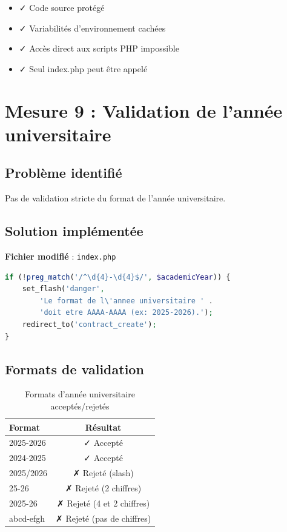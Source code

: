 \documentclass[11pt,a4paper,french]{report}
\begin{document}
\begin{itemize}
    \item ✓ Code source protégé
    \item ✓ Variabilités d'environnement cachées
    \item ✓ Accès direct aux scripts PHP impossible
    \item ✓ Seul index.php peut être appelé
\end{itemize}

\newpage

\section{Mesure 9 : Validation de l'année universitaire}

\subsection{Problème identifié}

Pas de validation stricte du format de l'année universitaire.

\subsection{Solution implémentée}

\textbf{Fichier modifié} : \texttt{index.php}

\begin{lstlisting}[language=PHP]
if (!preg_match('/^\d{4}-\d{4}$/', $academicYear)) {
    set_flash('danger', 
        'Le format de l\'annee universitaire ' .
        'doit etre AAAA-AAAA (ex: 2025-2026).');
    redirect_to('contract_create');
}
\end{lstlisting}

\subsection{Formats de validation}

\begin{table}[H]
\centering
\caption{Formats d'année universitaire acceptés/rejetés}
\begin{tabular}{|l|c|}
\hline
\textbf{Format} & \textbf{Résultat} \\
\hline
2025-2026 & ✓ Accepté \\
\hline
2024-2025 & ✓ Accepté \\
\hline
2025/2026 & ✗ Rejeté (slash) \\
\hline
25-26 & ✗ Rejeté (2 chiffres) \\
\hline
2025-26 & ✗ Rejeté (4 et 2 chiffres) \\
\hline
abcd-efgh & ✗ Rejeté (pas de chiffres) \\
\hline
\end{tabular}
\end{table}
\end{document}
